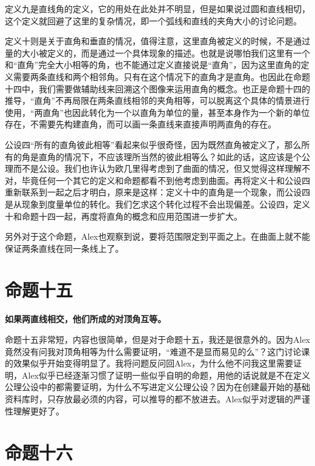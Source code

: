 \documentclass[
]{book}
\begin{document}
定义九是直线角的定义，它的用处在此处并不明显，但是如果说过圆和直线相切，这个定义就回避了这里的复杂情况，即一个弧线和直线的夹角大小的讨论问题。

定义十则是关于直角和垂直的情况，值得注意，这里直角被定义的时候，不是通过量的大小被定义的，而是通过一个具体现象的描述。也就是说哪怕我们这里有一个和``直角''完全大小相等的角，也不能通过定义直接说是``直角''，因为这里直角的定义需要两条直线和两个相邻角。只有在这个情况下的直角才是直角。也因此在命题十四中，我们需要做辅助线来回溯这个图像来运用直角的概念。也正是命题十四的推导，``直角''不再局限在两条直线相邻的夹角相等，可以脱离这个具体的情景进行使用，``两直角''也因此转化为一个以直角为单位的量，甚至本身作为一个新的单位存在，不需要先构建直角，而可以画一条直线来直接声明两直角的存在。

公设四``所有的直角彼此相等''看起来似乎很奇怪，因为既然直角被定义了，那么所有的角是直角的情况下，不应该理所当然的彼此相等么？如此的话，这应该是个公理而不是公设。我们也许认为欧几里得考虑到了曲面的情况，但又觉得这样理解不对，毕竟任何一个其它的定义和命题都看不到他考虑到曲面。再将定义十和公设四重新联系到一起之后才明白，原来是这样：定义十中的直角是一个现象，而公设四是从现象到度量单位的转化。我们乞求这个转化过程不会出现偏差。公设四，定义十和命题十四一起，再度将直角的概念和应用范围进一步扩大。

另外对于这个命题，Alex也观察到说，要将范围限定到平面之上。在曲面上就不能保证两条直线在同一条线上了。

\hypertarget{ux547dux9898ux5341ux4e94}{%
\section{命题十五}\label{ux547dux9898ux5341ux4e94}}

\textbf{如果两直线相交，他们所成的对顶角互等。}

命题十五非常短，内容也很简单，但是对于命题十五，我还是很意外的。因为Alex竟然没有问我对顶角相等为什么需要证明，``难道不是显而易见的么''？这门讨论课的效果似乎开始变得明显了。我将问题反问回Alex，为什么他不问我这里需要证明，Alex似乎已经逐渐习惯了证明一些似乎自明的命题，用他的话说就是不在定义公理公设中的都需要证明，为什么不写进定义公理公设？因为在创建最开始的基础资料库时，只存放最必须的内容，可以推导的都不放进去。Alex似乎对逻辑的严谨性理解更好了。

\hypertarget{ux547dux9898ux5341ux516d}{%
\section{命题十六}\label{ux547dux9898ux5341ux516d}}
\end{document}
